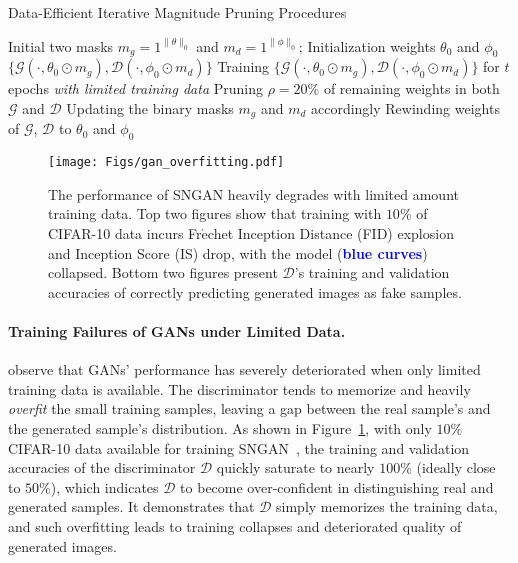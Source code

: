 \documentclass{article}
\begin{document}
\begin{multicols}{2}

\begin{algorithm}[H]
\caption{Data-Efficient Iterative Magnitude Pruning Procedures}
\label{alg:IMP}
\begin{algorithmic}[1]
     Initial two masks $m_g=1^{\|\theta\|_0}$ and $m_d=1^{\|\phi\|_0}$; Initialization weights $\theta_0$ and $\phi_0$
     $\{\mathcal{G}(\cdot,\theta_0\odot m_g),\mathcal{D}(\cdot,\phi_0\odot m_d)\}$
    \REPEAT
    \STATE Training $\{\mathcal{G}(\cdot,\theta_0\odot m_g),\mathcal{D}(\cdot,\phi_0\odot m_d)\}$ for $t$ epochs \emph{with limited training data}
    \STATE Pruning $\rho=20\%$ of remaining weights in both $\mathcal{G}$ and $\mathcal{D}$
    \STATE Updating the binary masks $m_g$ and $m_d$ accordingly
    \STATE Rewinding weights of $\mathcal{G}$, $\mathcal{D}$ to $\theta_0$ and $\phi_0$
\end{algorithmic}
\end{algorithm}

\begin{figure}[H]
\centering
\vspace{-4mm}
\texttt{[image: Figs/gan\_overfitting.pdf]}
\vspace{-4mm}
\caption{\small{The performance of SNGAN heavily degrades with limited amount training data. Top two figures show that training with $10\%$ of CIFAR-10 data incurs Fr$\acute{\mathrm{e}}$chet Inception Distance (FID) explosion and Inception Score (IS) drop, with the model (\textcolor{blue}{\bf{blue curves}}) collapsed. Bottom two figures present $\mathcal{D}$'s training and validation accuracies of correctly predicting generated images as fake samples.}}
\label{fig:gan_overfitting}
\end{figure}


\end{multicols}

\paragraph{Training Failures of GANs under Limited Data.} \cite{karras2020training,zhao2020diffaugment} observe that GANs' performance has severely deteriorated when only limited training data is available. The discriminator tends to memorize and heavily \textit{overfit} the small training samples, leaving a gap between the real sample's and the generated sample's distribution. As shown in Figure~\ref{fig:gan_overfitting}, with only $10\%$ CIFAR-10 data available for training SNGAN~\cite{miyato2018spectral}, the training and validation accuracies of the discriminator $\mathcal{D}$ quickly saturate to nearly $100\%$ (ideally close to $50\%$), which indicates $\mathcal{D}$ to become over-confident in distinguishing real and generated samples. It demonstrates that $\mathcal{D}$ simply memorizes the training data, and such overfitting leads to training collapses and deteriorated quality of generated images.
\end{document}
